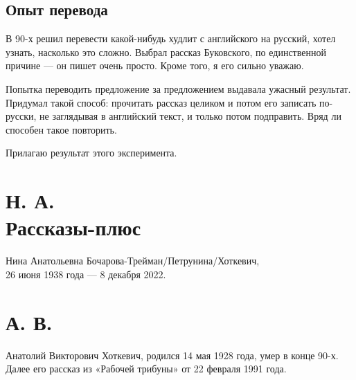 \documentclass{book}
\begin{document}
\backmatter

\chapter*{Опыт перевода}

В 90-х решил перевести какой-нибудь худлит с английского на русский, хотел узнать, насколько это сложно.
Выбрал рассказ Буковского, по единственной причине --- он пишет очень просто.
Кроме того, я его сильно уважаю.

Попытка переводить предложение за предложением выдавала ужасный результат.
Придумал такой способ: прочитать рассказ целиком и потом его записать по-русски, не заглядывая в английский текст, и только потом подправить.
Вряд ли способен такое повторить.

Прилагаю результат этого эксперимента.



\part*{Н. А.\\
Рассказы-плюс}
Нина Анатольевна Бочарова-Трейман/Петрунина/Хоткевич,\\
26 июня 1938 года --- 8 декабря 2022.




\part*{А. В.\\
}

Анатолий Викторович Хоткевич, родился 14 мая 1928 года, умер в конце 90-х.
Далее его рассказ из «Рабочей трибуны» от 22 февраля 1991 года.



\tableofcontents
\end{document}
